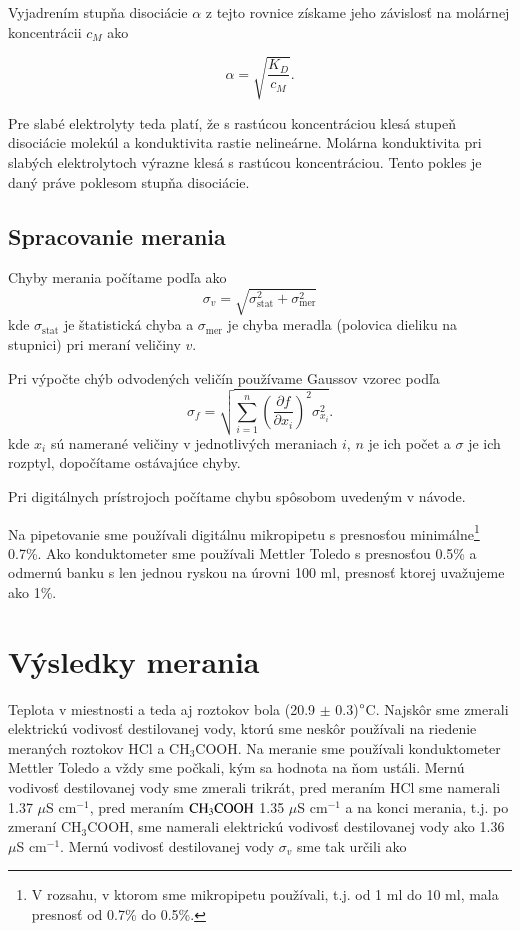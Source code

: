 \documentclass{article}
\begin{document}
Vyjadrením stupňa disociácie $\alpha$ z tejto rovnice získame jeho závislosť na molárnej koncentrácii $c_M$ ako 

\begin{equation}
	\alpha = \sqrt{\frac{K_D}{c_M}}.
\end{equation}

Pre slabé elektrolyty teda platí, že s rastúcou koncentráciou klesá stupeň disociácie molekúl a konduktivita rastie nelineárne. Molárna konduktivita pri slabých elektrolytoch výrazne klesá s rastúcou koncentráciou. Tento pokles je daný práve poklesom stupňa disociácie.

\subsection{Spracovanie merania}
Chyby merania počítame podľa \cite{stat} ako
    \begin{equation} \label{stat:1}
        \sigma_v = \sqrt{\sigma_{\text{stat}}^2 + \sigma_{\text{mer}}^2 }
    \end{equation}
    kde $\sigma_{\text{stat}}$ je štatistická chyba a $\sigma_{\text{mer}}$ je chyba meradla (polovica dieliku na stupnici) pri meraní veličiny $v$. 
    
Pri výpočte chýb odvodených veličín používame Gaussov vzorec podľa \cite{stat}
    \begin{equation} \label{stat:2}
            \sigma_f = \sqrt{\sum_{i=1}^{n}\left( \frac{\partial f}{\partial x_i}\right)^2 \sigma_{x_i}^2}.
    \end{equation}
kde $x_i$ sú namerané veličiny v jednotlivých meraniach $i$, $n$ je ich počet a $\sigma$ je ich rozptyl, dopočítame ostávajúce chyby.

Pri digitálnych prístrojoch počítame chybu spôsobom uvedeným v návode. 

Na pipetovanie sme používali digitálnu mikropipetu s presnosťou minimálne\footnote{V rozsahu, v ktorom sme mikropipetu používali, t.j. od 1 ml do 10 ml, mala presnosť od 0.7\% do 0.5\%.} 0.7\%. Ako konduktometer sme používali Mettler Toledo s presnosťou 0.5\% a odmernú banku s len jednou ryskou na úrovni 100 ml, presnosť ktorej uvažujeme ako 1\%. 



\section{Výsledky merania}
Teplota v miestnosti a teda aj roztokov bola (20.9 $\pm$ 0.3)$\degree$C. Najskôr sme zmerali elektrickú vodivosť destilovanej vody, ktorú sme neskôr používali na riedenie meraných roztokov HCl a CH$_3$COOH. Na meranie sme používali konduktometer Mettler Toledo a vždy sme počkali, kým sa hodnota na ňom ustáli. Mernú vodivosť destilovanej vody sme zmerali trikrát, pred meraním HCl sme namerali 1.37 $\mu$S cm$^{-1}$, pred meraním $\ce{CH$_3$COOH}$ 1.35 $\mu$S cm$^{-1}$ a na konci merania, t.j. po zmeraní CH$_3$COOH, sme namerali elektrickú vodivosť destilovanej vody ako 1.36 $\mu$S cm$^{-1}$. Mernú vodivosť destilovanej vody ${\sigma}_v$ sme tak určili ako 
\end{document}
